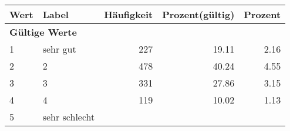      \begin{longtable}{lXrrr}
     \toprule
     \textbf{Wert} & \textbf{Label} & \textbf{Häufigkeit} & \textbf{Prozent(gültig)} & \textbf{Prozent} \\
     \endhead
     \midrule
     \multicolumn{5}{l}{\textbf{Gültige Werte}}\\

     1 &
     \multicolumn{1}{X}{ sehr gut   } &


       \num{227} &
       \num[round-mode=places,round-precision=2]{19.11} &
         \num[round-mode=places,round-precision=2]{2.16} \\

     2 &
     \multicolumn{1}{X}{ 2   } &


       \num{478} &
       \num[round-mode=places,round-precision=2]{40.24} &
         \num[round-mode=places,round-precision=2]{4.55} \\

     3 &
     \multicolumn{1}{X}{ 3   } &


       \num{331} &
       \num[round-mode=places,round-precision=2]{27.86} &
         \num[round-mode=places,round-precision=2]{3.15} \\

     4 &
     \multicolumn{1}{X}{ 4   } &


       \num{119} &
       \num[round-mode=places,round-precision=2]{10.02} &
         \num[round-mode=places,round-precision=2]{1.13} \\

     5 &
     \multicolumn{1}{X}{ sehr schlecht   } &



\end{longtable}
